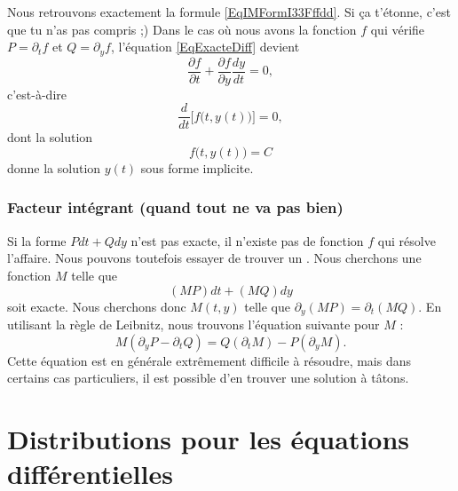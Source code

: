 Nous retrouvons exactement la formule \eqref{EqIMFormI33Fffdd}. Si ça t'étonne, c'est que tu n'as pas compris ;) Dans le cas où nous avons la fonction \( f\) qui vérifie \( P=\partial_tf\) et \( Q=\partial_yf\), l'équation \eqref{EqExacteDiff} devient
\begin{equation}
	\frac{ \partial f }{ \partial t }+\frac{ \partial f }{ \partial y }\frac{ dy }{ dt }=0,
\end{equation}
c'est-à-dire
\begin{equation}
	\frac{ d }{ dt }\Big[ f\big( t,y(t) \big) \Big]=0,
\end{equation}
dont la solution
\begin{equation}
	f\big( t,y(t) \big)=C
\end{equation}
donne la solution \( y(t)\) sous forme implicite.

\subsubsection{Facteur intégrant (quand tout ne va pas bien)}

Si la forme \( Pdt+Qdy\) n'est pas exacte, il n'existe pas de fonction \( f\) qui résolve l'affaire. Nous pouvons toutefois essayer de trouver un . Nous cherchons une fonction \( M\) telle que
\begin{equation}
	(MP)dt+(MQ)dy
\end{equation}
soit exacte. Nous cherchons donc \( M(t,y)\) telle que \( \partial_y(MP)=\partial_t(MQ)\). En utilisant la règle de Leibnitz, nous trouvons l'équation suivante pour \( M\) :
\begin{equation}		\label{EqDuFacteurIntegrant}
	M(\partial_yP-\partial_tQ)=Q(\partial_tM)-P(\partial_yM).
\end{equation}
Cette équation est en générale extrêmement difficile à résoudre, mais dans certains cas particuliers, il est possible d'en trouver une solution à tâtons.

\section{Distributions pour les équations différentielles}
\label{SecTNgeNms}

